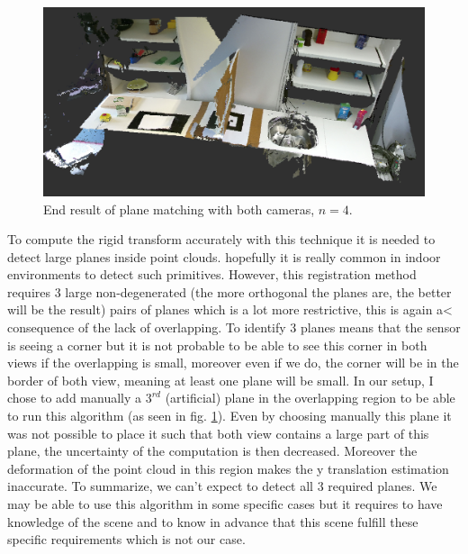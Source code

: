 \begin{figure}[h!]
    \centering
    \includegraphics[width=\textwidth]{images/reg2.png}
    \caption{End result of plane matching with both cameras, $n=4$.}
    \label{fig:planes_reg}
\end{figure}

To compute the rigid transform accurately with this technique it is needed to detect large planes inside point clouds. hopefully it is really common in indoor environments to detect such primitives. However, this registration method requires 3 large non-degenerated (the more orthogonal the planes are, the better will be the result) pairs of planes which is a lot more restrictive, this is again a< consequence of the lack of overlapping. To identify 3 planes means that the sensor is seeing a corner but it is not probable to be able to see this corner in both views if the overlapping is small, moreover even if we do, the corner will be in the border of both view, meaning at least one plane will be small. In our setup, I chose to add manually a $3^{rd}$ (artificial) plane in the overlapping region to be able to run this algorithm (as seen in fig. \ref{fig:planes_reg}). Even by choosing manually this plane it was not possible to place it such that both view contains a large part of this plane, the uncertainty of the computation is then decreased. Moreover the deformation of the point cloud in this region makes the y translation estimation inaccurate.
To summarize, we can't expect to detect all 3 required planes. We may be able to use this algorithm in some specific cases but it requires to have knowledge of the scene and to know in advance that this scene fulfill these specific requirements which is not our case.